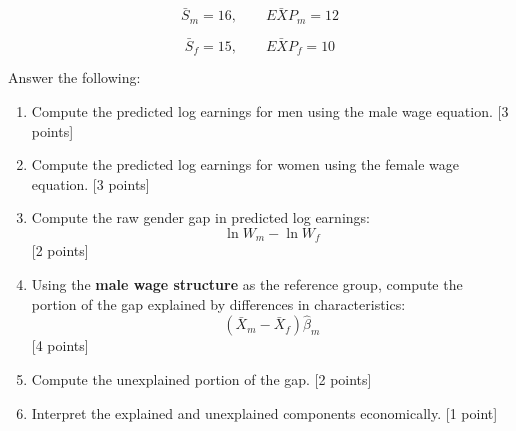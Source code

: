 \documentclass[12pt]{article}
\begin{document}
\[
\bar{S}_m = 16, \qquad \bar{EXP}_m = 12
\]

\[
\bar{S}_f = 15, \qquad \bar{EXP}_f = 10
\]

Answer the following:

\begin{enumerate}[label=\textbf{(\alph*)}]

\item Compute the predicted log earnings for men using the male wage equation. \hfill [3 points]

\item Compute the predicted log earnings for women using the female wage equation. \hfill [3 points]

\item Compute the raw gender gap in predicted log earnings:
\[
\ln W_m - \ln W_f
\]
\hfill [2 points]

\item Using the \textbf{male wage structure} as the reference group, compute the portion of the gap explained by differences in characteristics:
\[
(\bar{X}_m - \bar{X}_f)\hat{\beta}_m
\]
\hfill [4 points]

\item Compute the unexplained portion of the gap. \hfill [2 points]

\item Interpret the explained and unexplained components economically. \hfill [1 point]

\end{enumerate}
\end{document}
